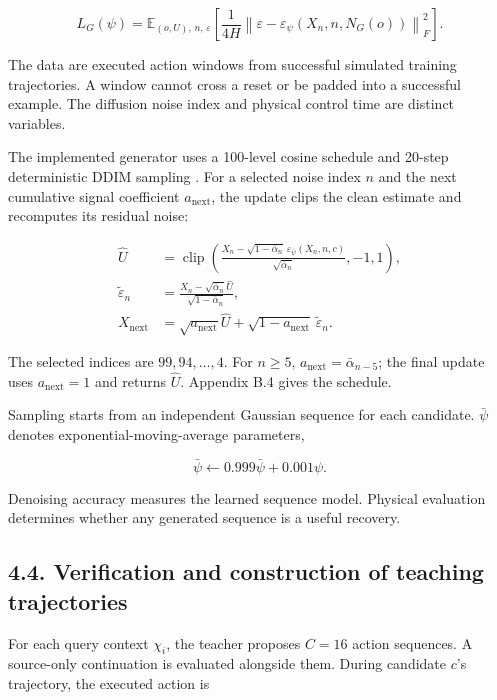 \documentclass[
  american,
  11pt,
  a4paper,
]{article}
\begin{document}
\[
L_G(\psi)=
\mathbb E_{(o,U),\,n,\,\varepsilon}
\left[\frac{1}{4H}
\left\|\varepsilon-\varepsilon_\psi(X_n,n,N_G(o))\right\|_F^2\right].
\tag{16}\label{eq:16}
\]

The data are executed action windows from successful simulated training
trajectories. A window cannot cross a reset or be padded into a
successful example. The diffusion noise index and physical control time
are distinct variables.

The implemented generator uses a 100-level cosine schedule and 20-step
deterministic DDIM sampling \cite{song2021ddim}. For a selected noise index \(n\)
and the next cumulative signal coefficient \(a_{\mathrm{next}}\), the
update clips the clean estimate and recomputes its residual noise:

\[
\begin{aligned}
\widehat U&=\operatorname{clip}\!\left(
\frac{X_n-\sqrt{1-\bar\alpha_n}\,\varepsilon_{\bar\psi}(X_n,n,c)}
{\sqrt{\bar\alpha_n}},-1,1\right),\\
\widetilde\varepsilon_n&=\frac{X_n-\sqrt{\bar\alpha_n}\widehat U}
{\sqrt{1-\bar\alpha_n}},\\
X_{\mathrm{next}}&=\sqrt{a_{\mathrm{next}}}\widehat U+
\sqrt{1-a_{\mathrm{next}}}\,\widetilde\varepsilon_n.
\end{aligned}
\tag{17}\label{eq:17}
\]

The selected indices are \(99,94,\ldots,4\). For \(n\ge5\),
\(a_{\mathrm{next}}=\bar\alpha_{n-5}\); the final update uses
\(a_{\mathrm{next}}=1\) and returns \(\widehat U\). Appendix B.4 gives
the schedule.

Sampling starts from an independent Gaussian sequence for each
candidate. \(\bar\psi\) denotes exponential-moving-average parameters,

\[
\bar\psi\leftarrow0.999\bar\psi+0.001\psi.
\tag{18}\label{eq:18}
\]

Denoising accuracy measures the learned sequence model. Physical
evaluation determines whether any generated sequence is a useful
recovery.

\subsection{4.4. Verification and construction of teaching
trajectories}\label{verification-and-construction-of-teaching-trajectories}

For each query context \(\chi_i\), the teacher proposes \(C=16\) action
sequences. A source-only continuation is evaluated alongside them.
During candidate \(c\)'s trajectory, the executed action is
\end{document}
